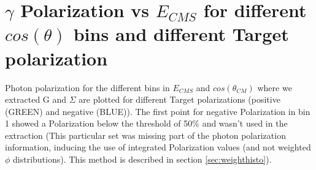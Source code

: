 \clearpage
\newpage

\section{\texorpdfstring{$\gamma$}{gamma} Polarization vs \texorpdfstring{$E_{CMS}$}{E-CMS} for different \texorpdfstring{$cos(\theta)$}{cos(theta} bins and different Target polarization}
 Photon polarization for the different bins in $E_{CMS}$ and $cos(\theta_{CM})$ where we extracted G and $\Sigma$ are plotted for different Target polarizations (positive (GREEN) and negative (BLUE)). The first point for negative Polarization in bin 1 showed a Polarization below the threshold of 50\% and wasn't used in the extraction (This particular set was missing part of the photon polarization information, inducing the use of integrated Polarization values (and not weighted $\phi$ distributions). This method is described in section \ref{sec:weighthisto}).
\begin{figure}[htb]
  \begin{center}
     \\
  \end{center}
\end{figure}
\begin{figure}[htb]
\ContinuedFloat
  \begin{center} 
     \\    
  \end{center}
\end{figure}
